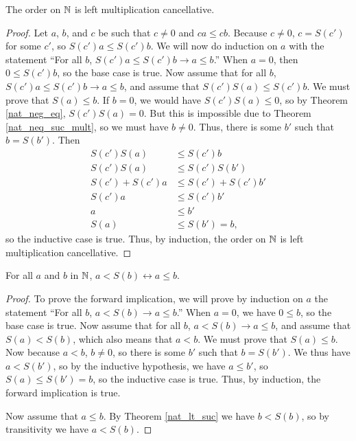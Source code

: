 \documentclass[../math.tex]{subfiles}
\begin{document}
\begin{instance}
    The order on $\mathbb{N}$ is left multiplication cancellative.
\end{instance}
\begin{proof}
    Let $a$, $b$, and $c$ be such that $c \neq 0$ and $ca \leq cb$.  Because $c
    \neq 0$, $c = S(c')$ for some $c'$, so $S(c')a \leq S(c')b$.  We will now do
    induction on $a$ with the statement ``For all $b$, $S(c')a \leq S(c')b
    \rightarrow a \leq b$.''  When $a = 0$, then $0 \leq S(c')b$, so the base
    case is true.  Now assume that for all $b$, $S(c')a \leq S(c')b \rightarrow
    a \leq b$, and assume that $S(c')S(a) \leq S(c')b$.  We must prove that
    $S(a) \leq b$.  If $b = 0$, we would have $S(c')S(a) \leq 0$, so by Theorem
    \ref{nat_neg_eq}, $S(c')S(a) = 0$.  But this is impossible due to Theorem
    \ref{nat_neq_suc_mult}, so we must have $b \neq 0$.  Thus, there is some
    $b'$ such that $b = S(b')$.  Then
    \begin{align*}
        S(c')S(a) &\leq S(c')b \\
        S(c')S(a) &\leq S(c')S(b') \\
        S(c') + S(c')a &\leq S(c') + S(c')b' \\
        S(c')a &\leq S(c')b' \\
        a &\leq b' \\
        S(a) &\leq S(b') = b,
    \end{align*}
    so the inductive case is true.  Thus, by induction, the order on $\mathbb{N}$ is
    left multiplication cancellative.
\end{proof}

\begin{theorem} \label{nat_lt_suc_le}
    For all $a$ and $b$ in $\mathbb{N}$, $a < S(b) \leftrightarrow a \leq b$.
\end{theorem}
\begin{proof}
    To prove the forward implication, we will prove by induction on $a$ the
    statement ``For all $b$, $a < S(b) \rightarrow a \leq b$.''  When $a = 0$,
    we have $0 \leq b$, so the base case is true.  Now assume that for all $b$,
    $a < S(b) \rightarrow a \leq b$, and assume that $S(a) < S(b)$, which also
    means that $a < b$.  We must prove that $S(a) \leq b$.  Now because $a < b$,
    $b \neq 0$, so there is some $b'$ such that $b = S(b')$.  We thus have $a <
    S(b')$, so by the inductive hypothesis, we have $a \leq b'$, so $S(a) \leq
    S(b') = b$, so the inductive case is true.  Thus, by induction, the forward
    implication is true.

    Now assume that $a \leq b$.  By Theorem \ref{nat_lt_suc} we have $b < S(b)$,
    so by transitivity we have $a < S(b)$.
\end{proof}
\end{document}

